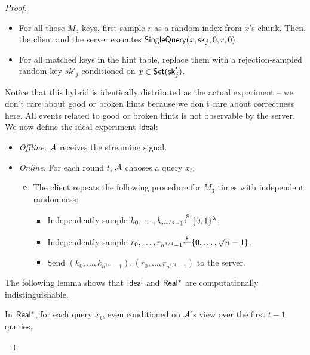 \begin{proof}
\begin{itemize}
\begin{itemize}
            \item For all those $M_3$ keys, first sample $r$ as a random index from $x$'s chunk. Then, the client and the server executes $\mathsf{SingleQuery}(x, \mathsf{sk}_j, 0, r, 0)$.
            
            \item For all matched keys in the hint table, replace them with a rejection-sampled random key $sk'_j$ conditioned on $x\in\mathsf{Set}(\mathsf{sk}'_j)$.
        \end{itemize}
        
    \end{itemize}
    
    Notice that this hybrid is identically distributed as the actual experiment -- we don't care about good or broken hints because we don't care about correctness here. All events related to good or broken hints is not observable by the server. We now define the ideal experiment  ${\sf Ideal}$:
    
    
    \begin{itemize}
    \item \textit{Offline.} $\mathcal{A}$ receives the streaming signal. 
    \item \textit{Online.} For each round $t$, $\mathcal{A}$ chooses a query $x_t$:
    \begin{itemize}
        \item The client repeats the following procedure for $M_3$ times with independent randomness:
        \begin{itemize}
                \item Independently sample $k_0,\dots,k_{n^{1/4}-1}{\overset{\$}{\leftarrow}}\{0,1\}^\lambda$;
                \item Independently sample $r_0,\dots,r_{n^{1/4}-1}{\overset{\$}{\leftarrow}}\{0,\dots,\sqrt{n}-1\}$.
                \item Send $(k_0,\dots,k_{n^{1/4}-1}),
                (r_0,\dots,r_{n^{1/4}-1})$ to the server.
        \end{itemize}
     \end{itemize}
    
    \end{itemize}    
   
    The following lemma shows that ${\sf Ideal}$ and ${\sf Real^*}$ are computationally indistinguishable.
    
    \begin{lemma}
        \label{lem:inductive-proof}
        In ${\sf Real^*}$, for each query $x_t$, even conditioned on $\mathcal{A}$'s view over the first $t-1$ queries, 
        

\end{lemma}
\end{proof}
